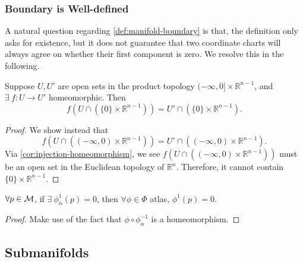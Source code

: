 \documentclass[../main.tex]{subfiles}
\begin{document}
    \subsubsection{Boundary is Well-defined}
    \begin{remark}
        A natural question regarding \cref{def:manifold-boundary} is that, the 
        definition only asks for existence, but it does not guarantee that two coordinate charts will always agree on whether their first component is zero.
        We resolve this in the following.
    \end{remark}
    \newpage
    \begin{theorem}\label{thm:manifold-boundary-well-defined}
         Suppose \(U, U'\) are open sets in the product topology \((-\infty, 0] 
         \times \mathbb{R}^{n-1}\), and \\\(\exists~ f : U \to U'\) homeomorphic. Then 
        \[
        f(U \cap (\{0\}\times \mathbb{R}^{n-1})) = U' \cap (\{0\}\times 
        \mathbb{R}^{n-1}).
        \]
    \end{theorem}
    \begin{proof}
        We show instead that 
        \[
        f(U \cap ((-\infty, 0)\times \mathbb{R}^{n-1})) = 
        U' \cap ((-\infty, 0)\times \mathbb{R}^{n-1}).
        \]
        Via \cref{cor:injection-homeomorphism}, we see 
        \(f(U \cap ((-\infty, 0)\times \mathbb{R}^{n-1}))\) must be an open set in 
        the Euclidean topology of \(\mathbb{R}^n\). Therefore, it cannot contain 
        \(\{0\}\times \mathbb{R}^{n-1}\).
    \end{proof}
    \begin{corollary}\label{cor:manifold-boundary-well-defined}
        \(\forall p \in \manifold[M]\), if \(\exists~ \phi_\alpha^1(p) = 0\), 
        then \(\forall \phi \in \Phi\) atlas, \(\phi^1(p)=0\).
    \end{corollary}
    \begin{proof}
        Make use of the fact that \(\phi\circ\phi_\alpha ^{-1}\) is a homeomorphism.
    \end{proof}

    \subsection{Submanifolds}
\end{document}
